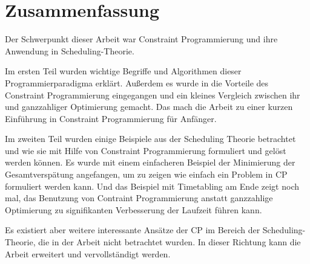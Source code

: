 \chapter{Zusammenfassung}

Der Schwerpunkt dieser Arbeit war Constraint Programmierung und ihre Anwendung in Scheduling-Theorie.

Im ersten Teil wurden wichtige Begriffe und Algorithmen dieser Programmierparadigma erklärt. Außerdem es wurde in die Vorteile des Constraint Programmierung eingegangen und ein kleines Vergleich zwischen ihr und ganzzahliger Optimierung gemacht. Das mach die Arbeit zu einer kurzen Einführung in Constraint Programmierung für Anfänger. 

Im zweiten Teil wurden einige Beispiele aus der Scheduling Theorie betrachtet und wie sie mit Hilfe von Constraint Programmierung formuliert und gelöst werden können. Es wurde mit einem einfacheren Beispiel der Minimierung der Gesamtverspätung angefangen, um zu zeigen wie einfach ein Problem in CP formuliert werden kann. Und das Beispiel mit Timetabling am Ende zeigt noch mal, das Benutzung von Contraint Programmierung anstatt ganzzahlige Optimierung zu signifikanten Verbesserung der Laufzeit führen kann.

Es existiert aber weitere interessante Ansätze der CP im Bereich der Scheduling-Theorie, die in der Arbeit nicht betrachtet wurden. In dieser Richtung kann die Arbeit erweitert und vervollständigt werden. 